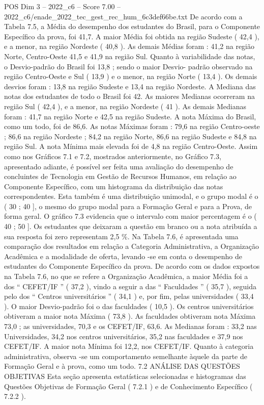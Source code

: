 \begin{textsample}{POS Dim 3 – 2022\_c6 – Score 7.00 – 2022\_c6/enade\_2022\_tec\_gest\_rec\_hum\_6c3def66be.txt}
De acordo com a Tabela 7.5, a Média do desempenho dos estudantes do Brasil, para o Componente Específico da prova, foi 41,7.
A maior Média foi obtida na região Sudeste ( 42,4 ), e a menor, na região Nordeste ( 40,8 ).
As demais Médias foram : 41,2 na região Norte, Centro-Oeste 41,5 e 41,9 na região Sul.
Quanto à variabilidade das notas, o Desvio-padrão do Brasil foi 13,8 ; sendo o maior Desvio- padrão observado na região Centro-Oeste e Sul ( 13,9 ) e o menor, na região Norte ( 13,4 ).
Os demais desvios foram : 13,8 na região Sudeste e 13,4 na região Nordeste.
A Mediana das notas dos estudantes de todo o Brasil foi 42.
As maiores Medianas ocorreram na região Sul ( 42,4 ), e a menor, na região Nordeste ( 41 ).
As demais Medianas foram : 41,7 na região Norte e 42,5 na região Sudeste.
A nota Máxima do Brasil, como um todo, foi de 86,6.
As notas Máximas foram : 79,6 na região Centro-oeste ; 86,6 na região Nordeste ; 84,2 na região Norte, 86,6 na região Sudeste e 84,8 na região Sul.
A nota Mínima mais elevada foi de 4,8 na região Centro-Oeste.
Assim como nos Gráficos 7.1 e 7.2, mostrados anteriormente, no Gráfico 7.3, apresentado adiante, é possível ser feita uma avaliação do desempenho de concluintes de Tecnologia em Gestão de Recursos Humanos, em relação ao Componente Específico, com um histograma da distribuição das notas correspondentes.
Esta também é uma distribuição unimodal, e o grupo modal é o ( 30 ; 40 ], o mesmo do grupo modal para a Formação Geral e para a Prova, de forma geral.
O gráfico 7.3 evidencia que o intervalo com maior percentagem é o ( 40 ; 50 ].
Os estudantes que deixaram a questão em branco ou a nota atribuída a sua resposta foi zero representam 2,5 \%.
Na Tabela 7.6, é apresentada uma comparação dos resultados em relação a Categoria Administrativa, a Organização Acadêmica e a modalidade de oferta, levando -se em conta o desempenho de estudantes do Componente Específico da prova.
De acordo com os dados expostos na Tabela 7.6, no que se refere a Organização Acadêmica, a maior Média foi a dos “ CEFET/IF ” ( 37,2 ), vindo a seguir a das “ Faculdades ” ( 35,7 ), seguida pelo dos “ Centros universitários ” ( 34,1 ) e, por fim, pelas universidades ( 33,4 ).
O maior Desvio-padrão foi o das faculdades ( 10,5 ).
Os centros universitários obtiveram a maior nota Máxima ( 73,8 ).
As faculdades obtiveram nota Máxima 73,0 ; as universidades, 70,3 e os CEFET/IF, 63,6.
As Medianas foram : 33,2 nas Universidades, 34,2 nos centros universitários, 35,2 nas faculdades e 37,9 nos CEFET/IF.
A maior nota Mínima foi 12,2, nos CEFET/IF.
Quanto à categoria administrativa, observa -se um comportamento semelhante àquele da parte de Formação Geral e à prova, como um todo. 7.2 ANÁLISE DAS QUESTÕES OBJETIVAS Esta seção apresenta estatísticas selecionadas e histogramas das Questões Objetivas de Formação Geral ( 7.2.1 ) e de Conhecimento Específico ( 7.2.2 ).

\end{textsample}
